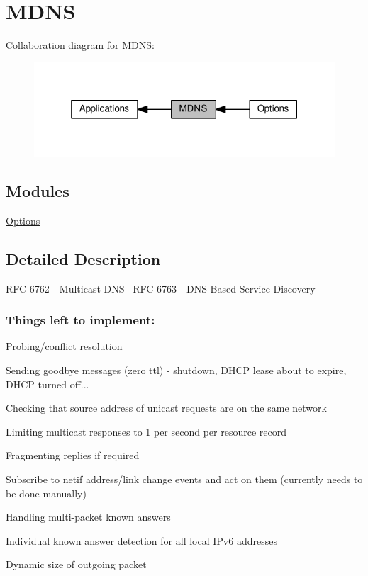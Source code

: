 \hypertarget{group__mdns}{}\section{M\+D\+NS}
\label{group__mdns}
Collaboration diagram for M\+D\+NS\+:
\nopagebreak
\begin{figure}[H]
\begin{center}
\leavevmode
\includegraphics[width=319pt]{group__mdns}
\end{center}
\end{figure}
\subsection*{Modules}
\begin{DoxyCompactItemize}
\item 
\hyperlink{group__mdns__opts}{Options}
\end{DoxyCompactItemize}


\subsection{Detailed Description}
R\+FC 6762 -\/ Multicast D\+NS~\newline
R\+FC 6763 -\/ D\+N\+S-\/\+Based Service Discovery~\newline
 
\begin{DoxyVerbInclude}
\end{DoxyVerbInclude}


\subsubsection*{Things left to implement\+: }


\begin{DoxyItemize}
\item Probing/conflict resolution
\item Sending goodbye messages (zero ttl) -\/ shutdown, D\+H\+CP lease about to expire, D\+H\+CP turned off...
\item Checking that source address of unicast requests are on the same network
\item Limiting multicast responses to 1 per second per resource record
\item Fragmenting replies if required
\item Subscribe to netif address/link change events and act on them (currently needs to be done manually)
\item Handling multi-\/packet known answers
\item Individual known answer detection for all local I\+Pv6 addresses
\item Dynamic size of outgoing packet 
\end{DoxyItemize}